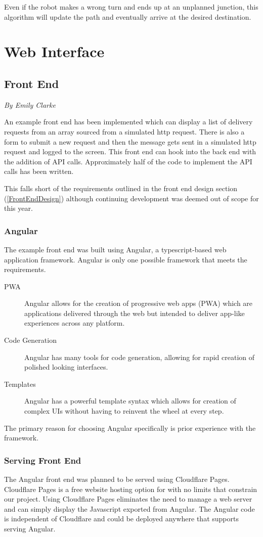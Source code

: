 \documentclass[12pt]{report}
\newcommand{\sectionAuthor}[1]{{\small\vspace{-1em}\textit{#1}}\bigskip\par}
\begin{document}
Even if the robot makes a wrong turn and ends up at an unplanned junction, this algorithm will update the path and eventually arrive at the desired destination.

\section{Web Interface}
\subsection{Front End}
\label{webInterfaceImplementation}
\sectionAuthor{By Emily Clarke}
An example front end has been implemented which can display a list of delivery requests from an array sourced from a simulated http request. There is also a form to submit a new request and then the message gets sent in a simulated http request and logged to the screen. This front end can hook into the back end with the addition of API calls. Approximately half of the code to implement the API calls has been written.

This falls short of the requirements outlined in the front end design section (\ref{FrontEndDesign}) although continuing development was deemed out of scope for this year.

\subsubsection{Angular}
The example front end was built using Angular, a typescript-based web application framework. Angular is only one possible framework that meets the requirements.
\begin{description}
   \item[PWA] Angular allows for the creation of progressive web apps (PWA) which are applications delivered through the web but intended to deliver app-like experiences across any platform.
   \item[Code Generation] Angular has many tools for code generation, allowing for rapid creation of polished looking interfaces.
   \item[Templates] Angular has a powerful template syntax which allows for creation of complex UIs without having to reinvent the wheel at every step.
\end{description}
The primary reason for choosing Angular specifically is prior experience with the framework. 

\subsubsection{Serving Front End}
The Angular front end was planned to be served using Cloudflare Pages. Cloudflare Pages is a free website hosting option for with no limits that constrain our project. Using Cloudflare Pages eliminates the need to manage a web server and can simply display the Javascript exported from Angular. The Angular code is independent of Cloudflare and could be deployed anywhere that supports serving Angular.
\end{document}
